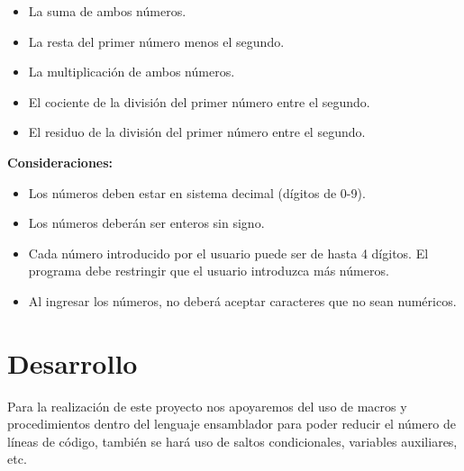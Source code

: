 \documentclass[letter,12 pt,titlepage]{article}
\begin{document}
        \begin{center}
            \begin{minipage}{0.95\linewidth}
                \begin{itemize}
                    \item La suma de ambos números.
                    \item La resta del primer número menos el segundo.
                    \item La multiplicación de ambos números.
                    \item El cociente de la división del primer número entre el segundo.
                    \item El residuo de la división del primer número entre el segundo.
                \end{itemize}
            \end{minipage}
        \end{center}

        \textbf{Consideraciones:}
        \begin{center}
            \begin{minipage}{0.95\linewidth}
                \begin{itemize}
                    \item Los números deben estar en sistema decimal (dígitos de 0-9).
                    \item Los números deberán ser enteros sin signo.
                    \item Cada número introducido por el usuario puede ser de hasta 4 dígitos. El programa debe restringir que el usuario introduzca más números.
                    \item Al ingresar los números, no deberá aceptar caracteres que no sean numéricos.
                \end{itemize}
            \end{minipage}
        \end{center}

    \section{Desarrollo}

    Para la realización de este proyecto nos apoyaremos del uso de macros y procedimientos dentro del lenguaje ensamblador para poder reducir el número de líneas de código, también se hará uso de saltos condicionales, variables auxiliares, etc.
\end{document}
